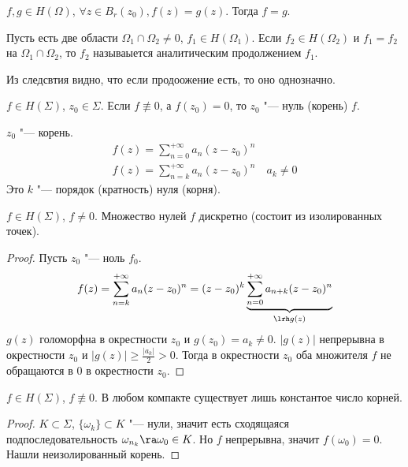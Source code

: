 \begin{conseq}
	$f, g \in H(\Omega)$, $\forall z \in B_r(z_0), f(z) = g(z)$.
	Тогда $f = g$.
\end{conseq}

\begin{Def}
	Пусть есть две области $\Omega_1 \cap \Omega_2 \ne 0$, $f_1 \in H(\Omega_1)$.
	Если $f_2 \in H(\Omega_2)$ и $f_1 = f_2$ на $\Omega_1 \cap \Omega_2$, то $f_2$ называыется аналитическим продолжением $f_1$.
\end{Def}

\begin{conseq}
	Из следсвтия видно, что если продоожение есть, то оно однозначно.
\end{conseq}

\begin{Def}
	$f \in H(\Sigma)$, $z_0 \in \Sigma$.
	Если $f \nequiv 0$, а $f(z_0) = 0$, то $z_0$ "--- нуль (корень) $f$.
\end{Def}

\begin{Rem}
	$z_0$ "--- корень.
	\begin{gather*}
			f(z) = \sum_{n=0}^{+\infty} a_n (z - z_0)^n \\
			f(z) = \sum_{n=k}^{+\infty} a_n (z - z_0)^n \quad a_k \ne 0
	\end{gather*}
	Это $k$ "--- порядок (кратность) нуля (корня).
\end{Rem}

\begin{theorem}
		$f \in H(\Sigma)$, $f \ne 0$.
		Множество нулей $f$ дискретно (состоит из изолированных точек).
\end{theorem}
\begin{proof}
	Пусть $z_0$ "--- ноль $f_0$.
	\begin{gather*}
		f(z) = \sum_{n=k}^{+\infty} a_n (z - z_0)^n = (z - z_0)^k \underbrace{\sum_{n=0}^{+\infty} a_{n+k} (z - z_0)^n}_{\lrh g(z)}
	\end{gather*}
	$g(z)$ голоморфна в окрестности $z_0$ и $g(z_0) = a_k \ne 0$.
	$|g(z)|$ непрерывна в окрестности $z_0$ и $|g(z)| \ge \frac{|a_k|}2 > 0$.
	Тогда в окрестности $z_0$ оба множителя $f$ не обращаются в 0 в окрестности $z_0$.
\end{proof}

\begin{conseq}
	$f \in H(\Sigma)$, $f \nequiv 0$.
	В любом компакте существует лишь константое число корней.
\end{conseq}
\begin{proof}
	$K \subset \Sigma$, $\{\omega_k\} \subset K$ "--- нули, значит есть сходящаяся подпоследовательность
	$\omega_{n_k} \ra \omega_0 \in K$.
	Но $f$ непрерывна, значит $f(\omega_0) = 0$.
	Нашли неизолированный корень.
\end{proof}

